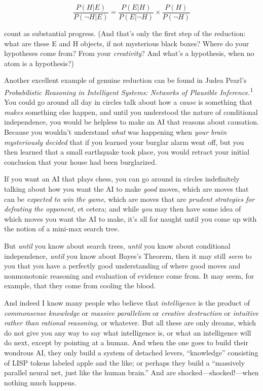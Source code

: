 \begin{equation*}
  \frac{P(H|E)}{P(\lnot H|E)} = \frac{P(E|H)}{P(E|\lnot H)} \times
  \frac{P(H)}{P(\lnot H)}
\end{equation*}


\bigskip

{
 count as substantial progress. (And that's only
the first step of the reduction: what are these E and H objects, if not
mysterious black boxes? Where do your hypotheses come from? From your
\textit{creativity}? And what's a hypothesis, when no
atom is a hypothesis?) }

{
 Another excellent example of genuine reduction can be found in
Judea Pearl's \textit{Probabilistic Reasoning in
Intelligent Systems: Networks of Plausible
Inference.}\textsuperscript{1} You could go around all day in circles
talk about how a \textit{cause} is something that \textit{makes}
something else happen, and until you understood the nature of
conditional independence, you would be helpless to make an AI that
reasons about causation. Because you wouldn't
understand \textit{what} was happening when \textit{your brain
mysteriously decided} that if you learned your burglar alarm went off,
but you then learned that a small earthquake took place, you would
retract your initial conclusion that your house had been burglarized.}

{
 If you want an AI that plays chess, you can go around in circles
indefinitely talking about how you want the AI to make \textit{good}
moves, which are moves that can be \textit{expected to win the game},
which are moves that are \textit{prudent strategies for defeating the
opponent}, et cetera; and while \textit{you} may then have some idea of
which moves you want the AI to make, it's all for
naught until you come up with the notion of a mini-max search tree.}

{
 But \textit{until} you know about search trees, \textit{until} you
know about conditional independence, \textit{until} you know about
Bayes's Theorem, then it may still \textit{seem} to you
that you have a perfectly good understanding of where good moves and
nonmonotonic reasoning and evaluation of evidence come from. It may
seem, for example, that they come from cooling the blood.}

{
 And indeed I know many people who believe that
\textit{intelligence} is the product of \textit{commonsense knowledge}
or \textit{massive parallelism} or \textit{creative destruction} or
\textit{intuitive rather than rational reasoning}, or whatever. But all
these are only dreams, which do not give you any way to say what
intelligence is, or what an intelligence will do next, except by
pointing at a human. And when the one goes to build their wondrous AI,
they only build a system of detached levers,
``knowledge'' consisting of LISP
tokens labeled apple and the like; or perhaps they build a
``massively parallel neural net, just like the human
brain.'' And are shocked---shocked!---when nothing
much happens.}

